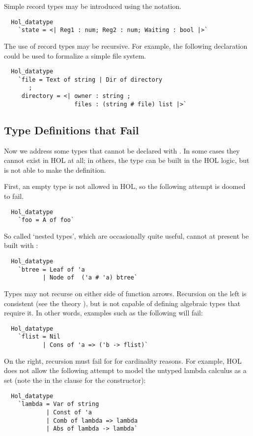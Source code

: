%
Simple record types may be introduced using the  notation.
%
\begin{hol}
\begin{verbatim}
  Hol_datatype
    `state = <| Reg1 : num; Reg2 : num; Waiting : bool |>`
\end{verbatim}
\end{hol}
%
The use of record types may be recursive. For example, the following
declaration could be used to formalize a simple file system.
%
\begin{hol}
\begin{verbatim}
  Hol_datatype
    `file = Text of string | Dir of directory
       ;
     directory = <| owner : string ;
                    files : (string # file) list |>`
\end{verbatim}
\end{hol}

\subsection{Type Definitions that Fail}

 Now we address some types that cannot be declared with .
In some cases they cannot exist in HOL at all; in others, the type
can be built in the HOL logic, but  is not able to make
the definition.

First, an empty type is not allowed in HOL, so the following attempt
is doomed to fail.
%
\begin{hol}
\begin{verbatim}
  Hol_datatype
    `foo = A of foo`
\end{verbatim}
\end{hol}
%
So called `nested types', which are occasionally quite useful, cannot
at present be built with :
%
\begin{hol}
\begin{verbatim}
  Hol_datatype
    `btree = Leaf of 'a
           | Node of  ('a # 'a) btree`
\end{verbatim}
\end{hol}
%
Types may not recurse on either side of function arrows.  Recursion on
the left is consistent (see the theory ), but
 is not capable of defining algebraic types that
require it.  In other words, examples such as the following will fail:
%
\begin{hol}
\begin{verbatim}
  Hol_datatype
    `flist = Nil
           | Cons of 'a => ('b -> flist)`
\end{verbatim}
\end{hol}
%
On the right, recursion must fail for for cardinality reasons. For
example, HOL does not allow the following attempt to model the untyped
lambda calculus as a set (note the \holtxt{->} in the clause for the
 constructor):
%
\begin{hol}
\begin{verbatim}
  Hol_datatype
    `lambda = Var of string
            | Const of 'a
            | Comb of lambda => lambda
            | Abs of lambda -> lambda`
\end{verbatim}
\end{hol}

